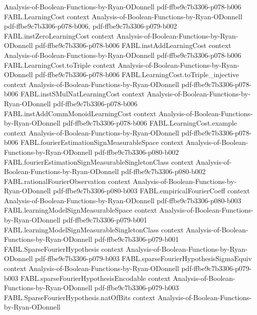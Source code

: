 \begin{theorem}
  {Analysis-of-Boolean-Functions-by-Ryan-ODonnell}
  {pdf-ffbe9c7b3306-p078-b006}
\proofstep
  {FABL.LearningCost}
  {context}
  {Analysis-of-Boolean-Functions-by-Ryan-ODonnell}
  {pdf-ffbe9c7b3306-p078-b006,
    pdf-ffbe9c7b3306-p079-b002}
\proofstep
  {FABL.instZeroLearningCost}
  {context}
  {Analysis-of-Boolean-Functions-by-Ryan-ODonnell}
  {pdf-ffbe9c7b3306-p078-b006}
\proofstep
  {FABL.instAddLearningCost}
  {context}
  {Analysis-of-Boolean-Functions-by-Ryan-ODonnell}
  {pdf-ffbe9c7b3306-p078-b006}
\proofstep
  {FABL.LearningCost.toTriple}
  {context}
  {Analysis-of-Boolean-Functions-by-Ryan-ODonnell}
  {pdf-ffbe9c7b3306-p078-b006}
\proofstep
  {FABL.LearningCost.toTriple_injective}
  {context}
  {Analysis-of-Boolean-Functions-by-Ryan-ODonnell}
  {pdf-ffbe9c7b3306-p078-b006}
\proofstep
  {FABL.instSMulNatLearningCost}
  {context}
  {Analysis-of-Boolean-Functions-by-Ryan-ODonnell}
  {pdf-ffbe9c7b3306-p078-b006}
\proofstep
  {FABL.instAddCommMonoidLearningCost}
  {context}
  {Analysis-of-Boolean-Functions-by-Ryan-ODonnell}
  {pdf-ffbe9c7b3306-p078-b006}
\proofstep
  {FABL.LearningCost.example}
  {context}
  {Analysis-of-Boolean-Functions-by-Ryan-ODonnell}
  {pdf-ffbe9c7b3306-p078-b006}
\proofstep
  {FABL.fourierEstimationSignMeasurableSpace}
  {context}
  {Analysis-of-Boolean-Functions-by-Ryan-ODonnell}
  {pdf-ffbe9c7b3306-p080-b002}
\proofstep
  {FABL.fourierEstimationSignMeasurableSingletonClass}
  {context}
  {Analysis-of-Boolean-Functions-by-Ryan-ODonnell}
  {pdf-ffbe9c7b3306-p080-b002}
\proofstep
  {FABL.rationalFourierObservation}
  {context}
  {Analysis-of-Boolean-Functions-by-Ryan-ODonnell}
  {pdf-ffbe9c7b3306-p080-b003}
\proofstep
  {FABL.empiricalFourierCoeff}
  {context}
  {Analysis-of-Boolean-Functions-by-Ryan-ODonnell}
  {pdf-ffbe9c7b3306-p080-b003}
\proofstep
  {FABL.learningModelSignMeasurableSpace}
  {context}
  {Analysis-of-Boolean-Functions-by-Ryan-ODonnell}
  {pdf-ffbe9c7b3306-p079-b001}
\proofstep
  {FABL.learningModelSignMeasurableSingletonClass}
  {context}
  {Analysis-of-Boolean-Functions-by-Ryan-ODonnell}
  {pdf-ffbe9c7b3306-p079-b001}
\proofstep
  {FABL.SparseFourierHypothesis}
  {context}
  {Analysis-of-Boolean-Functions-by-Ryan-ODonnell}
  {pdf-ffbe9c7b3306-p079-b003}
\proofstep
  {FABL.sparseFourierHypothesisSigmaEquiv}
  {context}
  {Analysis-of-Boolean-Functions-by-Ryan-ODonnell}
  {pdf-ffbe9c7b3306-p079-b003}
\proofstep
  {FABL.sparseFourierHypothesisEncodable}
  {context}
  {Analysis-of-Boolean-Functions-by-Ryan-ODonnell}
  {pdf-ffbe9c7b3306-p079-b003}
\proofstep
  {FABL.SparseFourierHypothesis.natOfBits}
  {context}
  {Analysis-of-Boolean-Functions-by-Ryan-ODonnell}

\end{theorem}
